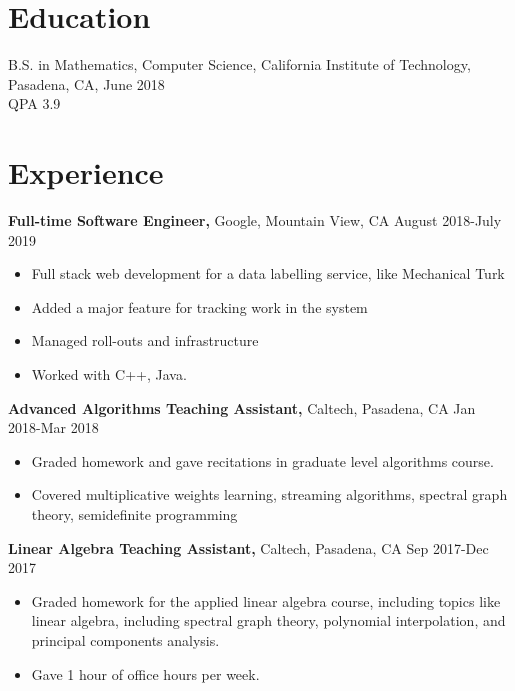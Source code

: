 \documentclass[margin]{res}
\begin{document}
 
 
 
\address{{\bf Present Address} \\ 1737 Liberty Parkway NW \\ Atlanta, GA 30318  \\
        (626) 399-3716 }
\address{{\bf Permanent Address} \\ 84 Cheesespring Road \\ Wilton, CT 06897}

 
\begin{resume} 

\section{Education} 
B.S. in Mathematics, Computer Science, California Institute of Technology, Pasadena, CA, June 2018 \\
QPA 3.9
 

\section{Experience}
 {\bf Full-time Software Engineer,} Google, Mountain View, CA \hfill August 2018-July 2019
 \begin{itemize} \itemsep -2pt  %
 \item Full stack web development for a data labelling service, like Mechanical Turk
 \item Added a major feature for tracking work in the system
 \item Managed roll-outs and infrastructure
 \item Worked with C++, Java.
 \end{itemize}

{\bf Advanced Algorithms Teaching Assistant,} Caltech, Pasadena, CA \hfill Jan 2018-Mar 2018
\begin{itemize} \itemsep -2pt %
\item Graded homework and gave recitations in graduate level algorithms course.
\item Covered multiplicative weights learning, streaming algorithms,
spectral graph theory, semidefinite programming
\end{itemize}
 
{\bf Linear Algebra Teaching Assistant,} Caltech, Pasadena, CA \hfill Sep 2017-Dec 2017
\begin{itemize} \itemsep -2pt %
\item Graded homework for the applied linear algebra course, including topics like linear algebra, including spectral graph theory, polynomial
interpolation, and principal components analysis.
\item Gave 1 hour of office hours per week.
\end{itemize}
 

\end{resume}
\end{document}
